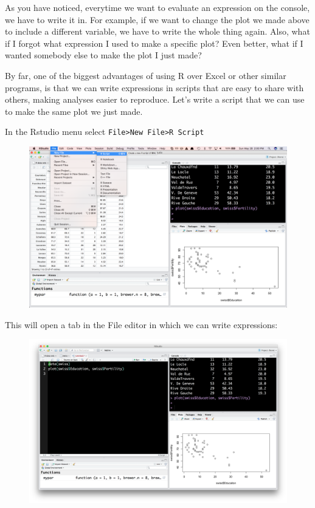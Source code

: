 \documentclass[]{article}
\theoremstyle{definition}
\theoremstyle{definition}
\theoremstyle{remark}
\begin{document}
As you have noticed, everytime we want to evaluate an expression on the
console, we have to write it in. For example, if we want to change the
plot we made above to include a different variable, we have to write the
whole thing again. Also, what if I forgot what expression I used to make
a specific plot? Even better, what if I wanted somebody else to make the
plot I just made?

By far, one of the biggest advantages of using R over Excel or other
similar programs, is that we can write expressions in scripts that are
easy to share with others, making analyses easier to reproduce. Let's
write a script that we can use to make the same plot we just made.

In the Rstudio menu select
\texttt{File\textgreater{}New\ File\textgreater{}R\ Script}

\begin{figure}[htbp]
\centering
\includegraphics{img/rstudio_new_script.png}
\caption{}
\end{figure}

This will open a tab in the File editor in which we can write
expressions:

\begin{figure}[htbp]
\centering
\includegraphics{img/rstudio_file.png}
\caption{}
\end{figure}
\end{document}
